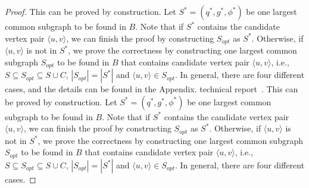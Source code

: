 \begin{proof}
 {\revision
 This can be proved by construction. Let $S^*=(q^*,g^*,\phi^*)$ be one largest common subgraph to be found in $B$. Note that if $S^*$ contains the candidate vertex pair $\langle u,v \rangle$, we can finish the proof by constructing $S_{opt}$ as $S^*$. Otherwise, if $\langle u,v \rangle$ is not in $S^*$, we prove the correctness by constructing one largest common subgraph $S_{opt}$ to be found in $B$ that contains candidate vertex pair $\langle u,v \rangle$, i.e., $S\subseteq S_{opt} \subseteq S\cup C$,  $|S_{opt}|=|S^*|$ and $\langle u,v \rangle\in S_{opt}$. In general, there are four different cases, and the details can be found in the 
 \ifx \CR\undefined
Appendix. 
\else
technical report~\cite{TR}. 
\fi
 }
    This can be proved by construction. Let $S^*=(q^*,g^*,\phi^*)$ be one largest common subgraph to be found in $B$. Note that if $S^*$ contains the candidate vertex pair $\langle u,v \rangle$, we can finish the proof by constructing $S_{opt}$ as $S^*$. Otherwise, if $\langle u,v \rangle$ is not in $S^*$, we prove the correctness by constructing one largest common subgraph $S_{opt}$ to be found in $B$ that contains candidate vertex pair $\langle u,v \rangle$, i.e., $S\subseteq S_{opt} \subseteq S\cup C$,  $|S_{opt}|=|S^*|$ and $\langle u,v \rangle\in S_{opt}$.
    In general, there are four different cases.


\end{proof}
